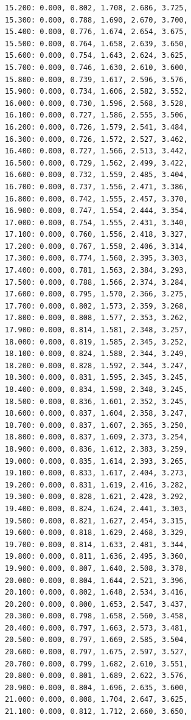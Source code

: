 \documentclass[12pt, a4paper]{article}
\begin{document}
\begin{scriptsize}
\begin{ttfamily}
\begin{lstlisting}
15.200: 0.000, 0.802, 1.708, 2.686, 3.725, 
15.300: 0.000, 0.788, 1.690, 2.670, 3.700, 
15.400: 0.000, 0.776, 1.674, 2.654, 3.675, 
15.500: 0.000, 0.764, 1.658, 2.639, 3.650, 
15.600: 0.000, 0.754, 1.643, 2.624, 3.625, 
15.700: 0.000, 0.746, 1.630, 2.610, 3.600, 
15.800: 0.000, 0.739, 1.617, 2.596, 3.576, 
15.900: 0.000, 0.734, 1.606, 2.582, 3.552, 
16.000: 0.000, 0.730, 1.596, 2.568, 3.528, 
16.100: 0.000, 0.727, 1.586, 2.555, 3.506, 
16.200: 0.000, 0.726, 1.579, 2.541, 3.484, 
16.300: 0.000, 0.726, 1.572, 2.527, 3.462, 
16.400: 0.000, 0.727, 1.566, 2.513, 3.442, 
16.500: 0.000, 0.729, 1.562, 2.499, 3.422, 
16.600: 0.000, 0.732, 1.559, 2.485, 3.404, 
16.700: 0.000, 0.737, 1.556, 2.471, 3.386, 
16.800: 0.000, 0.742, 1.555, 2.457, 3.370, 
16.900: 0.000, 0.747, 1.554, 2.444, 3.354, 
17.000: 0.000, 0.754, 1.555, 2.431, 3.340, 
17.100: 0.000, 0.760, 1.556, 2.418, 3.327, 
17.200: 0.000, 0.767, 1.558, 2.406, 3.314, 
17.300: 0.000, 0.774, 1.560, 2.395, 3.303, 
17.400: 0.000, 0.781, 1.563, 2.384, 3.293, 
17.500: 0.000, 0.788, 1.566, 2.374, 3.284, 
17.600: 0.000, 0.795, 1.570, 2.366, 3.275, 
17.700: 0.000, 0.802, 1.573, 2.359, 3.268, 
17.800: 0.000, 0.808, 1.577, 2.353, 3.262, 
17.900: 0.000, 0.814, 1.581, 2.348, 3.257, 
18.000: 0.000, 0.819, 1.585, 2.345, 3.252, 
18.100: 0.000, 0.824, 1.588, 2.344, 3.249, 
18.200: 0.000, 0.828, 1.592, 2.344, 3.247, 
18.300: 0.000, 0.831, 1.595, 2.345, 3.245, 
18.400: 0.000, 0.834, 1.598, 2.348, 3.245, 
18.500: 0.000, 0.836, 1.601, 2.352, 3.245, 
18.600: 0.000, 0.837, 1.604, 2.358, 3.247, 
18.700: 0.000, 0.837, 1.607, 2.365, 3.250, 
18.800: 0.000, 0.837, 1.609, 2.373, 3.254, 
18.900: 0.000, 0.836, 1.612, 2.383, 3.259, 
19.000: 0.000, 0.835, 1.614, 2.393, 3.265, 
19.100: 0.000, 0.833, 1.617, 2.404, 3.273, 
19.200: 0.000, 0.831, 1.619, 2.416, 3.282, 
19.300: 0.000, 0.828, 1.621, 2.428, 3.292, 
19.400: 0.000, 0.824, 1.624, 2.441, 3.303, 
19.500: 0.000, 0.821, 1.627, 2.454, 3.315, 
19.600: 0.000, 0.818, 1.629, 2.468, 3.329, 
19.700: 0.000, 0.814, 1.633, 2.481, 3.344, 
19.800: 0.000, 0.811, 1.636, 2.495, 3.360, 
19.900: 0.000, 0.807, 1.640, 2.508, 3.378, 
20.000: 0.000, 0.804, 1.644, 2.521, 3.396, 
20.100: 0.000, 0.802, 1.648, 2.534, 3.416, 
20.200: 0.000, 0.800, 1.653, 2.547, 3.437, 
20.300: 0.000, 0.798, 1.658, 2.560, 3.458, 
20.400: 0.000, 0.797, 1.663, 2.573, 3.481, 
20.500: 0.000, 0.797, 1.669, 2.585, 3.504, 
20.600: 0.000, 0.797, 1.675, 2.597, 3.527, 
20.700: 0.000, 0.799, 1.682, 2.610, 3.551, 
20.800: 0.000, 0.801, 1.689, 2.622, 3.576, 
20.900: 0.000, 0.804, 1.696, 2.635, 3.600, 
21.000: 0.000, 0.808, 1.704, 2.647, 3.625, 
21.100: 0.000, 0.812, 1.712, 2.660, 3.650, 

\end{lstlisting}
\end{ttfamily}
\end{scriptsize}
\end{document}
